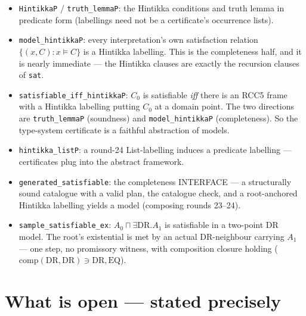\documentclass[11pt]{article}
\newcommand{\code}[1]{\texttt{#1}}
\begin{document}
\begin{itemize}[leftmargin=2em]
\item \code{HintikkaP} / \code{truth\_lemmaP}: the Hintikka conditions
and truth lemma in predicate form (labellings need not be a
certificate's occurrence lists).
\item \code{model\_hintikkaP}: every interpretation's own satisfaction
relation $\{(x,C) : x \models C\}$ is a Hintikka labelling.  This is
the completeness half, and it is nearly immediate --- the Hintikka
clauses are exactly the recursion clauses of \code{sat}.
\item \code{satisfiable\_iff\_hintikkaP}: $C_0$ is satisfiable
\emph{iff} there is an RCC5 frame with a Hintikka labelling putting
$C_0$ at a domain point.  The two directions are
\code{truth\_lemmaP} (soundness) and \code{model\_hintikkaP}
(completeness).  So the type-system certificate is a faithful
abstraction of models.
\item \code{hintikka\_listP}: a round-24 List-labelling induces a
predicate labelling --- certificates plug into the abstract framework.
\item \code{generated\_satisfiable}: the completeness INTERFACE --- a
structurally sound catalogue with a valid plan, the catalogue check,
and a root-anchored Hintikka labelling yields a model (composing
rounds 23--24).
\item \code{sample\_satisfiable\_ex}: $A_0 \sqcap \exists\mathrm{DR}.A_1$
is satisfiable in a two-point DR model.  The root's existential is met
by an actual DR-neighbour carrying $A_1$ --- one step, no promissory
witness, with composition closure holding
($\mathrm{comp}(\mathrm{DR},\mathrm{DR}) \ni \mathrm{DR},\mathrm{EQ}$).
\end{itemize}

\section{What is open --- stated precisely}
\end{document}
